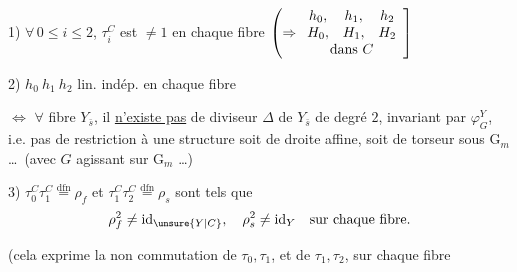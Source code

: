 
1) $\forall\,0\leq i\leq2$, $\tau_i^C$ est $\ne 1$ en chaque fibre $\left(\Rightarrow
\begin{array}{ccc}h_0,&h_1,&h_2\\ H_0,&H_1,&H_2\\\multicolumn{3}{c}{\text{dans } C}\end{array}\right]$

2) $h_0\ h_1\ h_2$ lin. indép. en chaque fibre


$\Longleftrightarrow$ \deleted{$\forall$} $\forall$ fibre  $Y_{\bar s}$, il \uline{n'existe pas} de diviseur $\Delta$ de $Y_{\bar s}$ de degré $2$, invariant par $\varphi_G^Y$, i.e. pas de restriction à une structure soit de droite affine, soit de  torseur sous $\mathrm G_m$ \ldots\ (avec $G$ agissant sur $\mathrm G_m$ \ldots)


3) $\tau_0^C\tau_1^C\overset{\mathrm{dfn}}=\rho_f$ et $\tau_1^C\tau_2^C\overset{\mathrm{dfn}}=\rho_s$ sont tels que
\[
\rho_f^2\ne\mathrm{id}_{\unsure{Y|C}},\quad \rho_s^2\ne\mathrm{id}_Y\quad\text{sur chaque fibre.}
\]

(cela exprime la non commutation de $\tau_0,\tau_1$, et de $\tau_1,\tau_2$, sur chaque fibre
